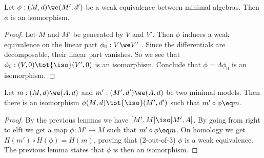 \begin{lemma}
	Let $\phi: (M, d) \we (M', d')$ be a weak equivalence between minimal algebras. Then $\phi$ is an isomorphism.
\end{lemma}
\begin{proof}
	Let $M$ and $M'$ be generated by $V$ and $V'$. Then $\phi$ induces a weak equivalence on the linear part $\phi_0: V \we V'$ \cite[Theorem 1.5.10]{loday}. Since the differentials are decomposable, their linear part vanishes. So we see that $\phi_0: (V, 0) \tot{\iso} (V', 0)$ is an isomorphism.
	Conclude that $\phi = \Lambda \phi_0$ is an isomorphism.
\end{proof}

\begin{theorem}
	Let $m: (M, d) \we (A, d)$ and $m': (M', d') \we (A, d)$ be two minimal models. Then there is an isomorphism $\phi (M, d) \tot{\iso} (M', d')$ such that $m' \circ \phi \eq m$.
\end{theorem}
\begin{proof}
	By the previous lemmas we have $[M', M] \iso [M', A]$. By going from right to elft we get a map $\phi: M' \to M$ such that $m' \circ \phi \eq m$. On homology we get $H(m') \circ H(\phi) = H(m)$, proving that (2-out-of-3) $\phi$ is a weak equivalence. The previous lemma states that $\phi$ is then an isomorphism.
\end{proof}
